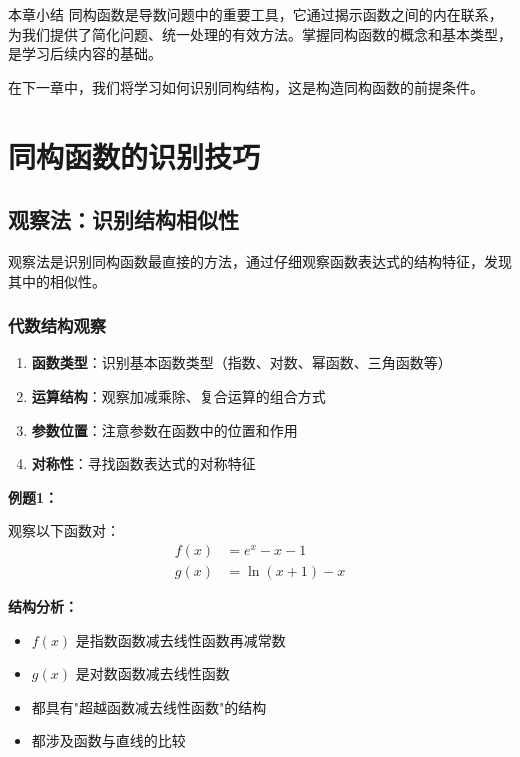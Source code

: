 \documentclass[a4paper,11pt]{ctexrep}
\newcommand{\exampleicon}{\ModeBadge[highlight]{例题}}
\newcommand{\analysisicon}{\ModeBadge[secondary]{分析}}
\theoremstyle{definition}
\begin{document}
\begin{summarybox}{本章小结}
同构函数是导数问题中的重要工具，它通过揭示函数之间的内在联系，为我们提供了简化问题、统一处理的有效方法。掌握同构函数的概念和基本类型，是学习后续内容的基础。

在下一章中，我们将学习如何识别同构结构，这是构造同构函数的前提条件。
\end{summarybox}

\chapter{同构函数的识别技巧}

\section{观察法：识别结构相似性}

观察法是识别同构函数最直接的方法，通过仔细观察函数表达式的结构特征，发现其中的相似性。

\subsection{代数结构观察}

\begin{methodbox}[代数结构观察要点]
\begin{enumerate}
    \item \textbf{函数类型}：识别基本函数类型（指数、对数、幂函数、三角函数等）
    \item \textbf{运算结构}：观察加减乘除、复合运算的组合方式
    \item \textbf{参数位置}：注意参数在函数中的位置和作用
    \item \textbf{对称性}：寻找函数表达式的对称特征
\end{enumerate}
\end{methodbox}

\exampleicon \textbf{例题1：}

观察以下函数对：
\begin{align}
f(x) &= e^x - x - 1 \\
g(x) &= \ln(x+1) - x
\end{align}

\analysisicon \textbf{结构分析：}
\begin{itemize}
    \item $f(x)$ 是指数函数减去线性函数再减常数
    \item $g(x)$ 是对数函数减去线性函数
    \item 都具有"超越函数减去线性函数"的结构
    \item 都涉及函数与直线的比较
\end{itemize}
\end{document}
